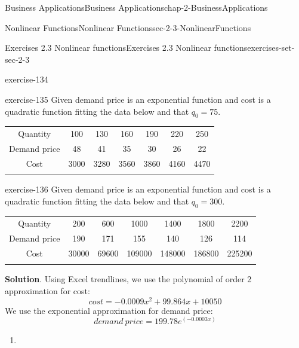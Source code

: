 \documentclass[oneside,10pt,]{book}
\numberwithin{equation}{section}
\newcommand{\hrulethin}  {\noalign{\hrule height 0.04em}}
\newcommand{\hrulemedium}{\noalign{\hrule height 0.07em}}
\newcommand{\hrulethick} {\noalign{\hrule height 0.11em}}
\begin{document}
\begin{chapterptx}{Business Applications}{}{Business Applications}{}{}{chap-2-BusinessApplications}
\begin{sectionptx}{Nonlinear Functions}{}{Nonlinear Functions}{}{}{sec-2-3-NonlinearFunctions}
\begin{exercises-subsection-numberless}{Exercises 2.3 Nonlinear functions}{}{Exercises 2.3 Nonlinear functions}{}{}{exercises-set-sec-2-3}
\begin{exercisegroup}
\begin{divisionexerciseeg}{19}{}{}{exercise-134}
\end{divisionexerciseeg}%
\begin{divisionexerciseeg}{20}{}{}{exercise-135}%
\hypertarget{p-880}{}%
Given demand price is an exponential function and cost is a quadratic function fitting the data below and that \(q_0=75\).%
\begin{sidebyside}{1}{0}{0}{0}%
\begin{sbspanel}{1}%
{\centering%
\begin{tabular}{ccccccc}\hrulethick
Quantity&100&130&160&190&220&250\tabularnewline\hrulethin
Demand price&48&41&35&30&26&22\tabularnewline\hrulemedium
Cost&3000&3280&3560&3860&4160&4470\tabularnewline\hrulemedium
\end{tabular}
\par}
\end{sbspanel}%
\end{sidebyside}%
\end{divisionexerciseeg}%
\begin{divisionexerciseeg}{21}{}{}{exercise-136}%
\hypertarget{p-881}{}%
Given demand price is an exponential function and cost is a quadratic function fitting the data below and that \(q_0=300\).%
\begin{sidebyside}{1}{0}{0}{0}%
\begin{sbspanel}{1}%
{\centering%
\begin{tabular}{ccccccc}\hrulethick
Quantity&200&600&1000&1400&1800&2200\tabularnewline\hrulethin
Demand price&190&171&155&140&126&114\tabularnewline\hrulemedium
Cost&30000&69600&109000&148000&186800&225200\tabularnewline\hrulemedium
\end{tabular}
\par}
\end{sbspanel}%
\end{sidebyside}%
\par\smallskip%
\noindent\textbf{Solution}.\hypertarget{solution-66}{}\quad%
\hypertarget{p-882}{}%
Using Excel trendlines, we use the polynomial of order 2 approximation for cost:%
%
\begin{equation*}
cost = -0.0009x^2  + 99.864x + 10050
\end{equation*}
\hypertarget{p-883}{}%
We use the exponential approximation for demand price:%
%
\begin{equation*}
demand\  price = 199.78e^{(-0.0003x)}
\end{equation*}
\leavevmode%
\begin{enumerate}[label=(\alph*)]
\item\hypertarget{li-268}{}%

\end{enumerate}
\end{divisionexerciseeg}
\end{exercisegroup}
\end{exercises-subsection-numberless}
\end{sectionptx}
\end{chapterptx}
\end{document}
